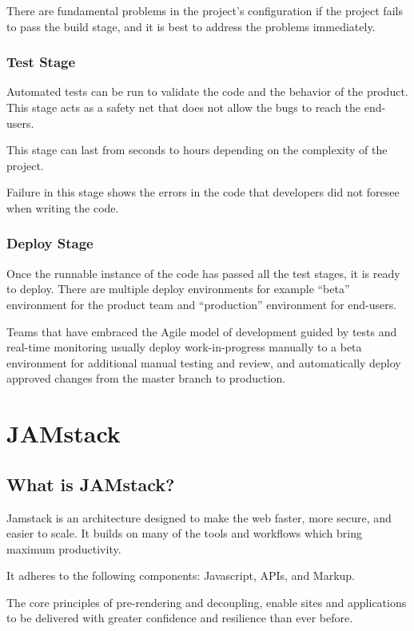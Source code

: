 There are fundamental problems in the project's configuration if the project fails to pass the build 
stage, and it is best to address the problems immediately.

\subsubsection{Test Stage}

Automated tests can be run to validate the code and the behavior of the product. This stage acts as a safety
net that does not allow the bugs to reach the end-users.

This stage can last from seconds to hours depending on the complexity of the project.

Failure in this stage shows the errors in the code that developers did not foresee when writing the code.

\subsubsection{Deploy Stage}

Once the runnable instance of the code has passed all the test stages, it is ready to deploy. There are 
multiple deploy environments for example “beta” environment for the product team and “production” 
environment for end-users.

Teams that have embraced the Agile model of development guided by tests and real-time monitoring usually 
deploy work-in-progress manually to a beta environment for additional manual testing and review, and 
automatically deploy approved changes from the master branch to production.

\section{JAMstack}

\subsection{What is JAMstack?}

Jamstack is an architecture designed to make the web faster, more secure, and easier to scale. 
It builds on many of the tools and workflows which bring maximum productivity.

It adheres to the following components: Javascript, APIs, and Markup.

The core principles of pre-rendering and decoupling, enable sites and applications to be delivered 
with greater confidence and resilience than ever before.~\cite{JAMstack}

